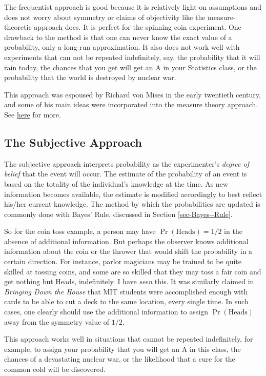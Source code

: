 \documentclass[captions=tableheading]{scrbook}
\begin{document}
The frequentist approach is good because it is relatively light on assumptions and does not worry about symmetry or claims of objectivity like the measure-theoretic approach does. It is perfect for the spinning coin experiment. One drawback to the method is that one can never know the exact value of a probability, only a long-run approximation. It also does not work well with experiments that can not be repeated indefinitely, say, the probability that it will rain today, the chances that you get will get an A in your Statistics class, or the probability that the world is destroyed by nuclear war.

This approach was espoused by Richard von Mises in the early twentieth century, and some of his main ideas were incorporated into the measure theory approach. See \href{http://www-history.mcs.st-andrews.ac.uk/Biographies/Mises.html}{here} for more.
\subsection{The Subjective Approach}
\label{sec-4-3-3}


The subjective approach interprets probability as the experimenter's \emph{degree of belief} that the event will occur. The estimate of the probability of an event is based on the totality of the individual's knowledge at the time. As new information becomes available, the estimate is modified accordingly to best reflect his/her current knowledge. The method by which the probabilities are updated is commonly done with Bayes' Rule, discussed in Section \ref{sec-Bayes--Rule}. 

So for the coin toss example, a person may have \(\Pr(\mbox{Heads})=1/2\) in the absence of additional information. But perhaps the observer knows additional information about the coin or the thrower that would shift the probability in a certain direction. For instance, parlor magicians may be trained to be quite skilled at tossing coins, and some are so skilled that they may toss a fair coin and get nothing but Heads, indefinitely. I have \emph{seen} this. It was similarly claimed in \emph{Bringing Down the House} \cite{Mezrich2003} that MIT students were accomplished enough with cards to be able to cut a deck to the same location, every single time. In such cases, one clearly should use the additional information to assign \(\Pr(\mbox{Heads})\) away from the symmetry value of \(1/2\).

This approach works well in situations that cannot be repeated indefinitely, for example, to assign your probability that you will get an A in this class, the chances of a devastating nuclear war, or the likelihood that a cure for the common cold will be discovered.
\end{document}
